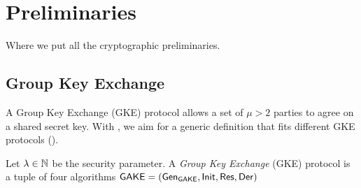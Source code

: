 \section{Preliminaries}\label{sec:preliminaries}
Where we put all the cryptographic preliminaries.

\subsection{Group Key Exchange}
A Group Key Exchange (GKE) protocol allows a set of $\mu > 2$ parties to agree on a shared secret key.
With , we aim for a generic definition that fits different GKE protocols ().

\begin{plaindef}\label{def:GKE}
	Let $\lambda\in \mathbb{N}$ be the security parameter. 
	A \textit{Group Key Exchange} (GKE) protocol is a tuple of four algorithms ${\mathsf{GAKE}} = ({\mathsf{\mathsf{Gen}}}_{{\mathsf{GAKE}}}, \allowbreak {\mathsf{Init}}, {\mathsf{Res}}, {\mathsf{Der}})$ 
\end{plaindef}